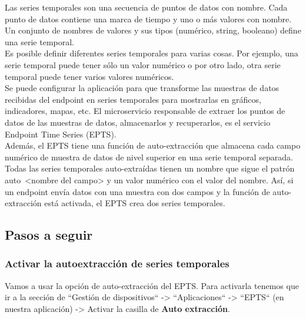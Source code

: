 Las series temporales son una secuencia de puntos de datos con nombre. Cada punto de datos contiene una marca de tiempo y uno o más valores con nombre. Un conjunto de nombres de valores y sus tipos (numérico, string, booleano) define una serie temporal. \\

Es posible definir diferentes series temporales para varias cosas. Por ejemplo, una serie temporal puede tener sólo un valor numérico o por otro lado, otra serie temporal puede tener varios valores numéricos. \\

Se puede configurar la aplicación para que transforme las muestras de datos recibidas del endpoint en series temporales para mostrarlas en gráficos, indicadores, mapas, etc. El microservicio responsable de extraer los puntos de datos de las muestras de datos, almacenarlos y recuperarlos, es el servicio Endpoint Time Series (EPTS). \\

Además, el EPTS tiene una función de auto-extracción que almacena cada campo numérico de muestra de datos de nivel superior en una serie temporal separada. Todas las series temporales auto-extraídas tienen un nombre que sigue el patrón auto~<nombre del campo> y un valor numérico con el valor del nombre. Así, si un endpoint envía datos con una muestra con dos campos y la función de auto-extracción está activada, el EPTS crea dos series temporales. \\

\subsection{Pasos a seguir}

\subsubsection{Activar la autoextracción de series temporales}

Vamos a usar la opción de auto-extracción del EPTS. Para activarla tenemos que ir a la sección de ``Gestión de dispositivos`` -> ``Aplicaciones`` -> ``EPTS`` (en nuestra aplicación) -> Activar la casilla de \textbf{Auto extracción}. \\

